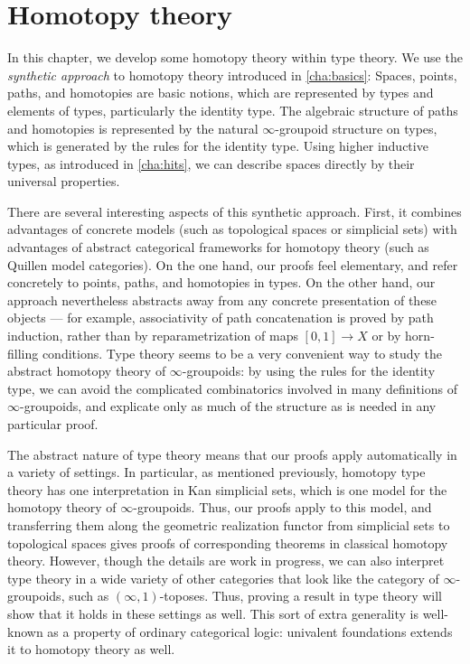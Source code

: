 \chapter{Homotopy theory}
\label{cha:homotopy}


In this chapter, we develop some homotopy theory within type theory.  We
use the \emph{synthetic approach} to homotopy theory introduced in
\cref{cha:basics}: Spaces, points, paths, and homotopies are basic
notions, which are represented by types and elements of types, particularly
the identity type.  The algebraic structure of paths and homotopies is
represented by the natural $\infty$-groupoid
%
structure on types, which is generated
by the rules for the identity type.  Using higher inductive types, as
introduced in \cref{cha:hits}, we can describe spaces directly by their
universal properties.

%
There are several interesting aspects of this synthetic approach.
First, it combines advantages of concrete models (such as topological
spaces
or simplicial sets)
with advantages of abstract categorical frameworks
for homotopy theory (such as Quillen model categories).
 On the one hand,
our proofs feel elementary, and refer concretely to
points, paths, and homotopies in types.  On the other hand, our approach nevertheless abstracts away from
any concrete presentation of these objects --- for example,
associativity of path concatenation is proved by path induction, rather
than by reparametrization of maps $[0,1] \to X$ or by horn-filling conditions.
Type theory seems to be a very convenient way to study the abstract homotopy theory
of $\infty$-groupoids: by using the rules for the identity type, we
can avoid the complicated combinatorics involved in many definitions of
$\infty$-groupoids, and explicate only as much of the
structure as is needed in any particular proof.

The abstract nature of type theory means that our proofs apply automatically in a variety of settings.
In particular, as mentioned previously, homotopy type theory has one interpretation in
Kan simplicial sets,
which is one model for the homotopy theory of $\infty$-groupoids.  Thus,
our proofs apply to this model, and transferring them along the geometric
realization functor from simplicial sets to topological spaces gives
proofs of corresponding theorems in classical homotopy theory.
However, though the details are work in progress, we can also
interpret type theory in a wide variety of other categories
that look like the category of $\infty$-groupoids, such as
$(\infty,1)$-toposes.
Thus, proving a result in type theory will show
that it holds in these settings as well.
This sort of extra generality is well-known as a property of ordinary categorical logic:
univalent foundations extends it to homotopy theory as well.

